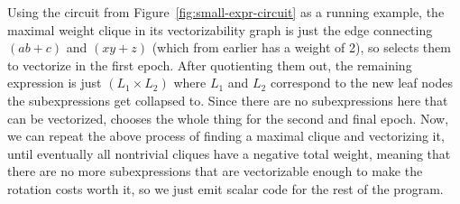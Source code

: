 Using the circuit from Figure~\ref{fig:small-expr-circuit} as a running example, the maximal weight clique in its vectorizability graph is just the edge connecting $(ab + c)$ and $(xy + z)$ (which from earlier has a weight of 2), so \system selects them to vectorize in the first epoch.
After quotienting them out, the remaining expression is just $(L_1 \times L_2)$ where $L_1$ and $L_2$ correspond to the new leaf nodes the subexpressions get collapsed to.
Since there are no subexpressions here that can be vectorized, \system chooses the whole thing for the second and final epoch.
Now, we can repeat the above process of finding a maximal clique and vectorizing it, until eventually all nontrivial cliques have a negative total weight, meaning that there are no more subexpressions that are vectorizable enough to make the rotation costs worth it, so we just emit scalar code for the rest of the program.

